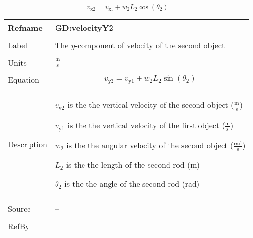 \documentclass[12pt]{article}
\begin{document}
\begin{displaymath}
{v_{\text{x}2}}={v_{\text{x}1}}+{w_{2}} {L_{2}} \cos\left({θ_{2}}\right)
\end{displaymath}
\vspace{\baselineskip}
\noindent
\begin{minipage}{\textwidth}
\begin{tabular}{>{\raggedright}p{}>{\raggedright\arraybackslash}p{}}
\toprule \textbf{Refname} & \textbf{GD:velocityY2}
\label{GD:velocityY2}
\\ \midrule \\
Label & The $y$-component of velocity of the second object
        
\\ \midrule \\
Units & $\frac{\text{m}}{\text{s}}$
        
\\ \midrule \\
Equation & \begin{displaymath}
           {v_{\text{y}2}}={v_{\text{y}1}}+{w_{2}} {L_{2}} \sin\left({θ_{2}}\right)
           \end{displaymath}
\\ \midrule \\
Description & \begin{symbDescription}
              \item{${v_{\text{y}2}}$ is the the vertical velocity of the second object ($\frac{\text{m}}{\text{s}}$)}
              \item{${v_{\text{y}1}}$ is the the vertical velocity of the first object ($\frac{\text{m}}{\text{s}}$)}
              \item{${w_{2}}$ is the the angular velocity of the second object ($\frac{\text{rad}}{\text{s}}$)}
              \item{${L_{2}}$ is the the length of the second rod (${\text{m}}$)}
              \item{${θ_{2}}$ is the the angle of the second rod (${\text{rad}}$)}
              \end{symbDescription}
\\ \midrule \\
Source & --
         
\\ \midrule \\
RefBy & 
\\ \bottomrule
\end{tabular}
\end{minipage}
\end{document}
